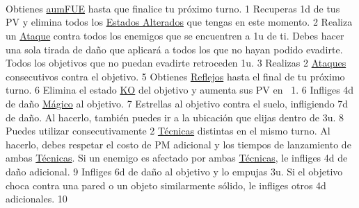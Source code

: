 \pagebreak \\
\\\\
 { Obtienes \hyperlink{status}{aumFUE} hasta que finalice tu próximo turno. }{\enstr}{1}  { Recuperas 1d de tus PV y elimina todos los \hyperlink{status}{Estados Alterados} que tengas en este momento. }{}{2}  { Realiza un \hyperlink{action}{Ataque} contra todos los enemigos que se encuentren a 1u de ti. Debes hacer una sola tirada de daño que aplicará a todos los que no hayan podido evadirte. Todos los objetivos que no puedan evadirte retroceden 1u. }{}{3}  { Realizas 2 \hyperlink{action}{Ataques} consecutivos contra el objetivo. }{}{5}  { Obtienes \hyperlink{status}{Reflejos} hasta el final de tu próximo turno. }{\blink}{6}  { Elimina el estado \hyperlink{status}{KO} del objetivo y aumenta sus PV en ~1. }{\ko}{6}  { Infliges 4d de daño \hyperlink{type}{Mágico} al objetivo. }{}{7}  { Estrellas al objetivo contra el suelo, infligiendo 7d de daño. Al hacerlo, también puedes ir a la ubicación que elijas dentro de 3u. }{}{8}  { Puedes utilizar consecutivamente 2 \hyperlink{action}{Técnicas} distintas en el mismo turno. Al hacerlo, debes respetar el costo de PM adicional y los tiempos de lanzamiento de ambas \hyperlink{action}{Técnicas}. Si un enemigo es afectado por ambas \hyperlink{action}{Técnicas}, le infliges 4d de daño adicional. }{}{9}  { Infliges 6d de daño al objetivo y lo empujas 3u. Si el objetivo choca contra una pared o un objeto similarmente sólido, le infliges otros 4d adicionales. }{}{10}
\pagebreak